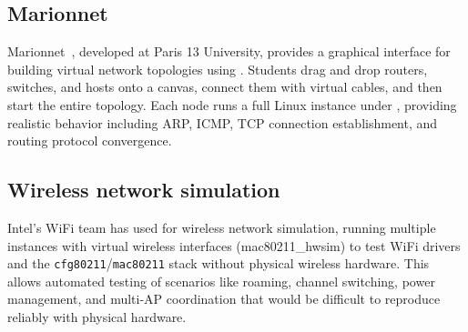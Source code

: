 \subsection{Marionnet}

Marionnet~\cite{marionnet}, developed at Paris 13 University, provides
a graphical interface for building virtual network topologies using
\UML{}.  Students drag and drop routers, switches, and hosts onto a
canvas, connect them with virtual cables, and then start the entire
topology.  Each node runs a full Linux instance under \UML{}, providing
realistic behavior including ARP, ICMP, TCP connection establishment,
and routing protocol convergence.

\subsection{Wireless network simulation}

Intel's WiFi team has used \UML{} for wireless network simulation,
running multiple \UML{} instances with virtual wireless interfaces
(mac80211\_hwsim) to test WiFi drivers and the \texttt{cfg80211}/\texttt{mac80211}
stack without physical wireless hardware.  This allows automated testing
of scenarios like roaming, channel switching, power management, and
multi-AP coordination that would be difficult to reproduce reliably
with physical hardware.

